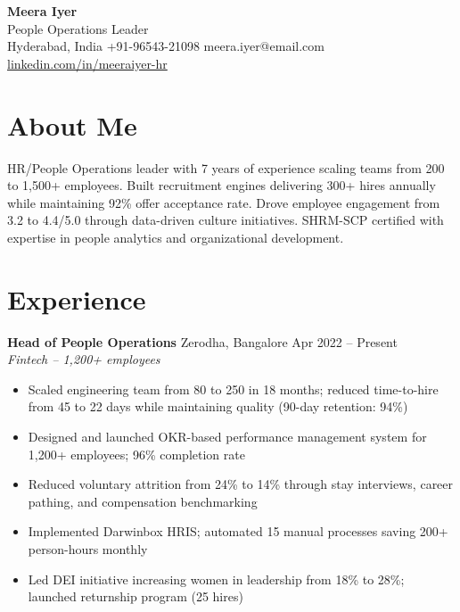 \documentclass[10pt,a4paper]{article}
\begin{document}
\begin{center}
\colorbox{warmbg}{\parbox{0.9\textwidth}{\centering\vspace{6pt}
{\fontsize{20}{24}\selectfont\bfseries\color{accent}Meera Iyer}\\[4pt]
{\small People Operations Leader}\\[4pt]
{\small Hyderabad, India \quad\textbullet\quad +91-96543-21098 \quad\textbullet\quad meera.iyer@email.com \quad\textbullet\quad \href{https://linkedin.com/in/meeraiyer-hr}{linkedin.com/in/meeraiyer-hr}}
\vspace{6pt}}}
\end{center}

\section{About Me}
HR/People Operations leader with 7 years of experience scaling teams from 200 to 1,500+ employees. Built recruitment engines delivering 300+ hires annually while maintaining 92\% offer acceptance rate. Drove employee engagement from 3.2 to 4.4/5.0 through data-driven culture initiatives. SHRM-SCP certified with expertise in people analytics and organizational development.

\section{Experience}

\textbf{Head of People Operations} \quad\textbar\quad Zerodha, Bangalore \hfill Apr 2022 -- Present\\
\textit{\color{accent}Fintech -- 1,200+ employees}
\begin{itemize}
  \item Scaled engineering team from 80 to 250 in 18 months; reduced time-to-hire from 45 to 22 days while maintaining quality (90-day retention: 94\%)
  \item Designed and launched OKR-based performance management system for 1,200+ employees; 96\% completion rate
  \item Reduced voluntary attrition from 24\% to 14\% through stay interviews, career pathing, and compensation benchmarking
  \item Implemented Darwinbox HRIS; automated 15 manual processes saving 200+ person-hours monthly
  \item Led DEI initiative increasing women in leadership from 18\% to 28\%; launched returnship program (25 hires)
\end{itemize}
\end{document}
